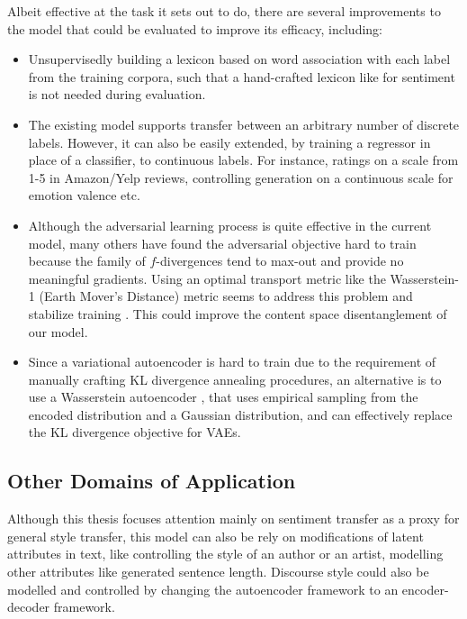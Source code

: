 Albeit effective at the task it sets out to do, there are several improvements to the model that could be evaluated to improve its efficacy, including:
\begin{itemize}
	\item Unsupervisedly building a lexicon based on word association with each label from the training corpora, such that a hand-crafted lexicon like \cite{hu2004mining} for sentiment is not needed during evaluation.
	\item The existing model supports transfer between an arbitrary number of discrete labels. However, it can also be easily extended, by training a regressor in place of a classifier, to continuous labels. For instance, ratings on a scale from 1-5 in Amazon/Yelp reviews, controlling generation on a continuous scale for emotion valence etc.
	\item Although the adversarial learning process is quite effective in the current model, many others have found the adversarial objective hard to train because the family of $f$-divergences tend to max-out and provide no meaningful gradients. Using an optimal transport metric like the Wasserstein-1 (Earth Mover's Distance) metric seems to address this problem and stabilize training \citep{arjovsky2017wasserstein, gulrajani2017improved}. This could improve the content space disentanglement of our model.
	\item Since a variational autoencoder is hard to train due to the requirement of manually crafting KL divergence annealing procedures, an alternative is to use a Wasserstein autoencoder \citep{tolstikhin2017wasserstein}, that uses empirical sampling from the encoded distribution and a Gaussian distribution, and can effectively replace the KL divergence objective for VAEs.
\end{itemize}


\subsection{Other Domains of Application}

Although this thesis focuses attention mainly on sentiment transfer as a proxy for general style transfer, this model can also be  rely on modifications of latent attributes in text, like controlling the style of an author or an artist, modelling other attributes like generated sentence length. Discourse style could also be modelled and controlled by changing the autoencoder framework to an encoder-decoder framework.
